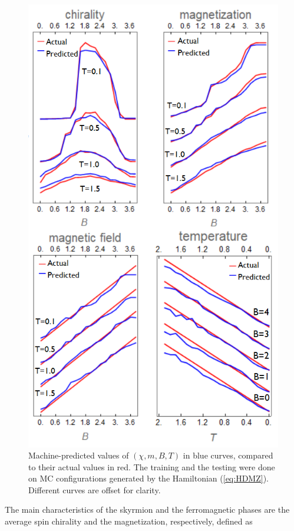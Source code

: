 \documentclass[reprint,amsmath,amssymb,aps,showpacs,superscriptaddress,prl]{revtex4-1}
\begin{document}
\begin{figure}[h]
\includegraphics[scale=0.6]{fig3.png}
\caption{Machine-predicted values of $(\chi, m, B, T)$ in blue curves, compared to their actual values in red. The training and the testing were done on MC configurations generated by the Hamiltonian (\ref{eq:HDMZ}). Different curves are offset for clarity.}\label{fig:2}
\end{figure}

The main characteristics of the skyrmion and the ferromagnetic phases are the average spin chirality and the magnetization, respectively, defined as
\end{document}
